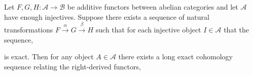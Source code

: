 \documentclass[12pt]{article}
\begin{document}
\begin{lemma} \label{lem:exact_seq_of_functors}
Let $F, G, H : \mathcal{A} \to \mathcal{B}$ be additive functors between abelian categories and let $\mathcal{A}$ have enough injectives. Suppose there exists a sequence of natural transformations $F \xrightarrow{\alpha} G \xrightarrow{\beta} H$ such that for each injective object $I \in \mathcal{A}$ that the sequence,
\begin{center}
\end{center}
is exact. Then for any object $A \in \mathcal{A}$ there exists a long exact cohomology sequence relating the right-derived functors,
\begin{center}
\end{center}
\end{lemma}
\end{document}
